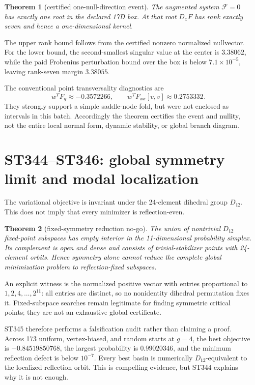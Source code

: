\documentclass[11pt,a4paper]{article}
\newtheorem{theorem}{Theorem}[section]
\begin{document}
\begin{theorem}[certified one-null-direction event]
The augmented system $\mathcal F=0$ has exactly one root in the declared 17D box. At that
root $D_xF$ has rank exactly seven and hence a one-dimensional kernel.
\end{theorem}

The upper rank bound follows from the certified nonzero normalized nullvector. For the lower
bound, the second-smallest singular value at the center is $3.38062$, while the paid
Frobenius perturbation bound over the box is below $7.1\times10^{-5}$, leaving rank-seven
margin $3.38055$.

The conventional point transversality diagnostics are
\[
w^TF_g\approx-0.3572266,\qquad
w^TF_{xx}[v,v]\approx0.2753332.
\]
They strongly support a simple saddle-node fold, but were not enclosed as intervals in this
batch. Accordingly the theorem certifies the event and nullity, not the entire local normal
form, dynamic stability, or global branch diagram.

\section{ST344--ST346: global symmetry limit and modal localization}

The variational objective is invariant under the 24-element dihedral group $D_{12}$. This
does not imply that every minimizer is reflection-even.

\begin{theorem}[fixed-symmetry reduction no-go]
The union of nontrivial $D_{12}$ fixed-point subspaces has empty interior in the
11-dimensional probability simplex. Its complement is open and dense and consists of
trivial-stabilizer points with 24-element orbits. Hence symmetry alone cannot reduce the
complete global minimization problem to reflection-fixed subspaces.
\end{theorem}

An explicit witness is the normalized positive vector with entries proportional to
$1,2,4,\ldots,2^{11}$: all entries are distinct, so no nonidentity dihedral permutation
fixes it. Fixed-subspace searches remain legitimate for finding symmetric critical points;
they are not an exhaustive global certificate.

ST345 therefore performs a falsification audit rather than claiming a proof. Across 173
uniform, vertex-biased, and random starts at $g=4$, the best objective is
$-0.84519850768$, the largest probability is $0.99020346$, and the minimum reflection
defect is below $10^{-7}$. Every best basin is numerically $D_{12}$-equivalent to the
localized reflection orbit. This is compelling evidence, but ST344 explains why it is not
enough.
\end{document}
